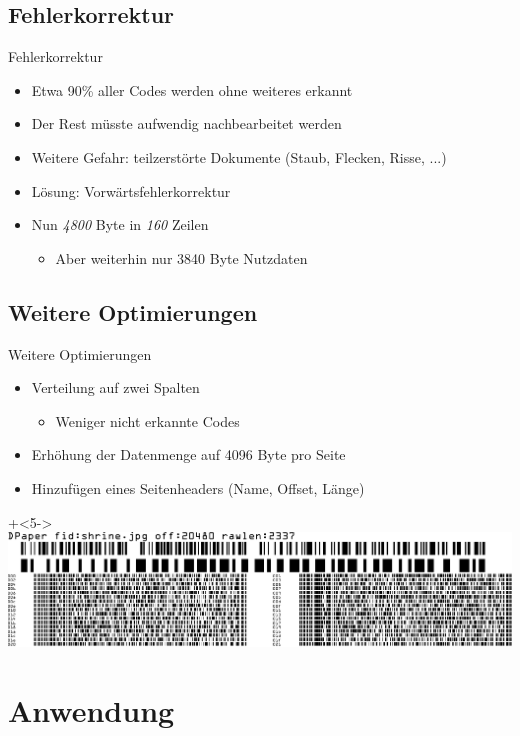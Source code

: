 \subsection{Fehlerkorrektur}
\begin{frame}[<+->]{Fehlerkorrektur}
	\begin{itemize}
	\item Etwa 90\% aller Codes werden ohne weiteres erkannt
	\item Der Rest müsste aufwendig nachbearbeitet werden
	\item Weitere Gefahr: teilzerstörte Dokumente (Staub, Flecken, Risse, ...)
	\item Lösung: Vorwärtsfehlerkorrektur
	\item Nun \emph{4800} Byte in \emph{160} Zeilen
		\begin{itemize}
		\item Aber weiterhin nur 3840 Byte Nutzdaten
		\end{itemize}
	\end{itemize}
\end{frame}

\subsection{Weitere Optimierungen}
\begin{frame}{Weitere Optimierungen}
	\begin{itemize}
	\item<1-> Verteilung auf zwei Spalten
		\begin{itemize}
		\item<2-> Weniger nicht erkannte Codes
		\end{itemize}
	\item<3-> Erhöhung der Datenmenge auf 4096 Byte pro Seite
	\item<4-> Hinzufügen eines Seitenheaders (Name, Offset, Länge)
	\end{itemize}
	\onslide+<5->\includegraphics[width=\textwidth]{penma/outputs/current_t.pdf}
\end{frame}

\section{Anwendung}

